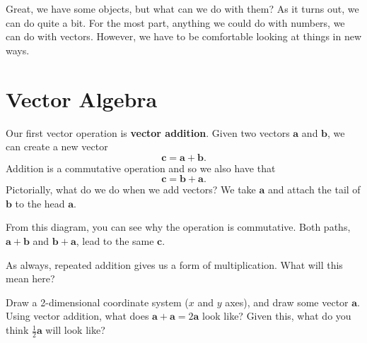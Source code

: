        Great, we have some objects, but what can we do with them?  As it turns out, we can do quite a bit.  For the most part, anything we could do with numbers, we can do with vectors.  However, we have to be comfortable looking at things in new ways.
        
        \section{Vector Algebra}
        
        Our first vector operation is \textbf{vector addition}.  Given two vectors $\mathbf{a}$ and $\mathbf{b}$, we can create a new vector
        \[
        \mathbf{c}=\mathbf{a}+\mathbf{b}.
        \]
        Addition is a commutative operation and so we also have that
        \[
        \mathbf{c}=\mathbf{b}+\mathbf{a}.
        \]
        Pictorially, what do we do when we add vectors? We take $\mathbf{a}$ and attach the tail of $\mathbf{b}$ to the head $\mathbf{a}$. 
        
        \begin{center}
        \end{center}
        
        From this diagram, you can see why the operation is commutative.  Both paths, $\mathbf{a}+\mathbf{b}$ and $\mathbf{b}+\mathbf{a}$, lead to the same $\mathbf{c}$.
        
        
        As always, repeated addition gives us a form of multiplication. What will this mean here? 
        
        \begin{exercise}
        Draw a 2-dimensional coordinate system ($x$ and $y$ axes), and draw some vector $\mathbf{a}$.  Using vector addition, what does $\mathbf{a}+\mathbf{a}=2\mathbf{a}$ look like? Given this, what do you think $\frac{1}{2}\mathbf{a}$ will look like? 
        \end{exercise}
        
